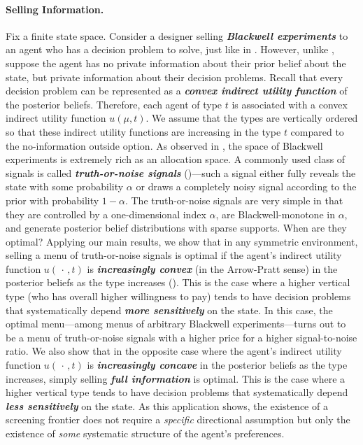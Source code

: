 \documentclass[12pt,letterpaper]{article}
\newenvironment{original}{\color{black}\noindent}{}
\theoremstyle{plain}
\theoremstyle{definition}
\theoremstyle{remark}
\renewcommand{\1}{\mathds{1}}
\theoremstyle{definition}
\begin{document}
\paragraph{Selling Information.}\hspace{-2mm}\begin{original}Fix a finite state space. Consider a designer selling \textit{\textbf{Blackwell experiments}} to an agent who has a decision problem to solve, just like in \citet*{bergemann2018design}. However, unlike \citet*{bergemann2018design}, suppose the agent has no private information about their prior belief about the state, but private information about their decision problems. Recall that every decision problem can be represented as a \textit{\textbf{convex indirect utility function}} of the posterior beliefs. Therefore, each agent of type $t$ is associated with a convex indirect utility function $u(\mu, t)$. We assume that the types are vertically ordered so that these indirect utility functions are increasing in the type $t$ compared to the no-information outside option. As observed in \citet*{bergemann2018design}, the space of Blackwell experiments is extremely rich as an allocation space. A commonly used class of signals is called \textit{\textbf{truth-or-noise signals}} (\citealt{lewis1994supplying})---such a signal either fully reveals the state  with some probability $\alpha$ or draws a completely noisy signal according to the prior with probability $1-\alpha$. The truth-or-noise signals are very simple in that they are controlled by a one-dimensional index $\alpha$, are Blackwell-monotone in $\alpha$, and generate posterior belief distributions with sparse supports. When are they optimal? Applying our main results, we show that in any symmetric environment, selling a menu of truth-or-noise signals is optimal if the agent's indirect utility function $u(\,\cdot\,, t)$ is \textit{\textbf{increasingly convex}} (in the Arrow-Pratt sense) in the posterior beliefs as the type increases (). This is the case where a higher vertical type (who has overall higher willingness to pay) tends to have decision problems that systematically depend \textit{\textbf{more sensitively}} on the state. In this case, the optimal menu---among menus of arbitrary Blackwell experiments---turns out to be a menu of truth-or-noise signals with a higher price for a higher signal-to-noise ratio. We also show that in the opposite case where the agent's indirect utility function $u(\,\cdot\,, t)$ is \textit{\textbf{increasingly concave}} in the posterior beliefs as the type increases, simply selling \textit{\textbf{full information}} is optimal. This is the case where a higher vertical type tends to have decision problems that systematically depend \textit{\textbf{less sensitively}} on the state. As this application shows, the existence of a screening frontier does not require a \textit{specific} directional assumption but only the existence of \textit{some} systematic structure of the agent's preferences.
\end{original}
\end{document}
